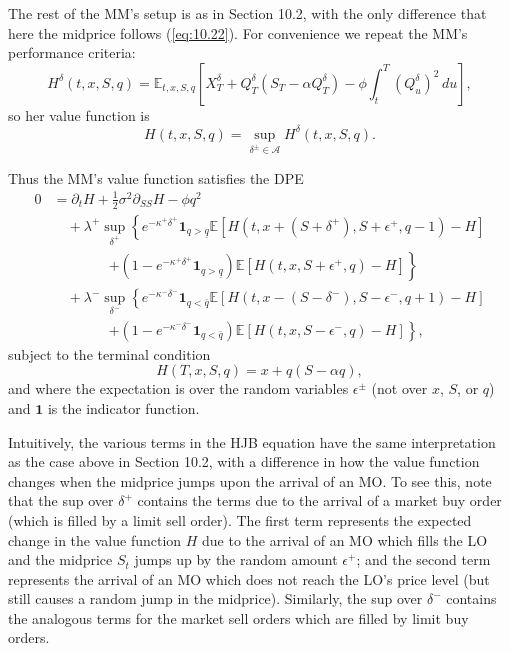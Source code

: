 \documentclass[11pt, a4paper]{book}
\newcommand{\E}{\mathbb{E}}
\newcommand{\Ind}{\mathbf{1}}
\begin{document}
	The rest of the MM's setup is as in Section 10.2, with the only difference that here the midprice follows (\ref{eq:10.22}). For convenience we repeat the MM's performance criteria:
	\[
	H^\delta(t, x, S, q) = \E_{t,x,S,q} \left[ X^\delta_T + Q^\delta_T (S_T - \alpha Q^\delta_T) - \phi \int_t^T (Q^\delta_u)^2 \, du \right],
	\]
	so her value function is
	\[
	H(t, x, S, q) = \sup_{\delta^\pm \in \mathcal{A}} H^\delta(t, x, S, q).
	\]
	
	Thus the MM's value function satisfies the DPE
	\begin{equation}
		\begin{aligned}
			0 &= \partial_t H + \tfrac{1}{2}\sigma^2 \partial_{SS} H - \phi q^2 \\
			&\quad + \lambda^+ \sup_{\delta^+} \left\{ e^{-\kappa^+ \delta^+} \Ind_{q > \underline{q}} \E \left[ H(t, x + (S + \delta^+), S + \epsilon^+, q - 1) - H \right] \right. \\
			&\qquad \qquad \left. + \left(1 - e^{-\kappa^+ \delta^+} \Ind_{q > \underline{q}}\right) \E \left[ H(t, x, S + \epsilon^+, q) - H \right] \right\} \\
			&\quad + \lambda^- \sup_{\delta^-} \left\{ e^{-\kappa^- \delta^-} \Ind_{q < \bar{q}} \E \left[ H(t, x - (S - \delta^-), S - \epsilon^-, q + 1) - H \right] \right. \\
			&\qquad \qquad \left. + \left(1 - e^{-\kappa^- \delta^-} \Ind_{q < \bar{q}}\right) \E \left[ H(t, x, S - \epsilon^-, q) - H \right] \right\},
		\end{aligned} \label{eq:10.23}
	\end{equation}
	subject to the terminal condition
	\begin{equation}
		H(T, x, S, q) = x + q (S - \alpha q), \label{eq:10.24}
	\end{equation}
	and where the expectation is over the random variables $\epsilon^\pm$ (not over $x$, $S$, or $q$) and $\Ind$ is the indicator function.
	
	Intuitively, the various terms in the HJB equation have the same interpretation as the case above in Section 10.2, with a difference in how the value function changes when the midprice jumps upon the arrival of an MO. To see this, note that the sup over $\delta^+$ contains the terms due to the arrival of a market buy order (which is filled by a limit sell order). The first term represents the expected change in the value function $H$ due to the arrival of an MO which fills the LO and the midprice $S_t$ jumps up by the random amount $\epsilon^+$; and the second term represents the arrival of an MO which does not reach the LO's price level (but still causes a random jump in the midprice). Similarly, the sup over $\delta^-$ contains the analogous terms for the market sell orders which are filled by limit buy orders.
	
\end{document}
